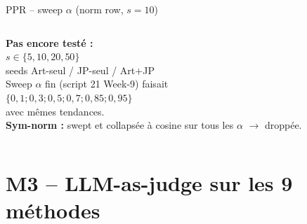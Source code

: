 \documentclass[aspectratio=169,10pt]{beamer}
\newcommand{\warnbox}[1]{%
  \begin{center}
  \colorbox{red!10}{\parbox{0.92\linewidth}{\centering #1}}
  \end{center}}
\begin{document}
\begin{frame}{PPR -- sweep $\alpha$ (norm row, $s{=}10$)}
\begin{columns}[T]
    \warnbox{\scriptsize \textbf{Pas encore testé :} \\[0.2em]
    $s \in \{5, 10, 20, 50\}$ \\
    seeds Art-seul / JP-seul / Art$+$JP \\[0.3em]
    Sweep $\alpha$ fin (script 21 Week-9) faisait \\
    $\{0{,}1; 0{,}3; 0{,}5; 0{,}7; 0{,}85; 0{,}95\}$ \\
    avec mêmes tendances. \\[0.3em]
    \textbf{Sym-norm :} swept et collapsée à cosine sur tous les $\alpha$ $\to$ droppée.}
  \end{columns}
\end{frame}

\section{M3 -- LLM-as-judge sur les 9 méthodes}
\end{document}
